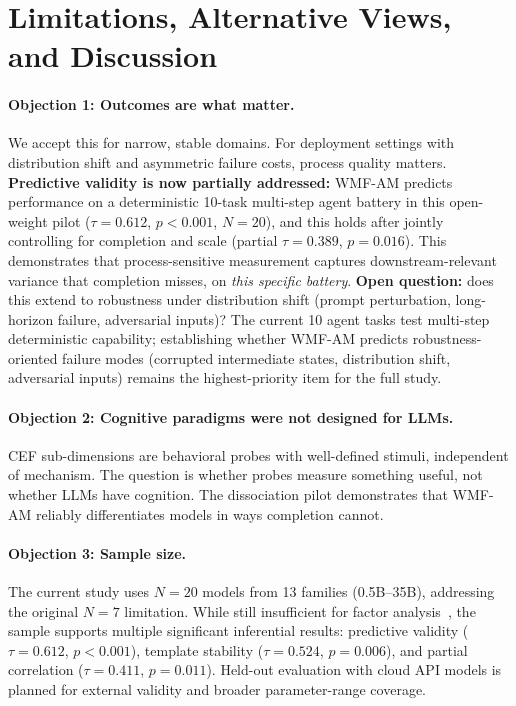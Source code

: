 \documentclass{article}
\begin{document}
\section{Limitations, Alternative Views, and Discussion}
\label{sec:discussion}

\paragraph{Objection 1: Outcomes are what matter.}
We accept this for narrow, stable domains. For deployment settings with
distribution shift and asymmetric failure costs, process quality
matters. \textbf{Predictive validity is now partially addressed:}
WMF-AM predicts performance on a deterministic 10-task multi-step
agent battery in this open-weight pilot ($\tau = 0.612$, $p < 0.001$, $N{=}20$),
and this holds after jointly controlling for completion and scale
(partial $\tau = 0.389$, $p = 0.016$). This demonstrates that
process-sensitive measurement captures downstream-relevant variance
that completion misses, on
\emph{this specific battery}. \textbf{Open question:} does this
extend to robustness under distribution shift (prompt perturbation,
long-horizon failure, adversarial inputs)? The current 10 agent tasks
test multi-step deterministic capability; establishing whether WMF-AM
predicts robustness-oriented failure modes (corrupted intermediate
states, distribution shift, adversarial inputs) remains the
highest-priority item for the full study.

\paragraph{Objection 2: Cognitive paradigms were not designed for LLMs.}
CEF sub-dimensions are behavioral probes with well-defined stimuli,
independent of mechanism. The question is whether probes measure
something useful, not whether LLMs have cognition. The dissociation
pilot demonstrates that WMF-AM reliably differentiates models in ways
completion cannot.

\paragraph{Objection 3: Sample size.}
The current study uses $N{=}20$ models from 13 families (0.5B--35B),
addressing the original $N{=}7$ limitation. While still insufficient for
factor analysis~\citep{card2020little}, the sample
supports multiple significant inferential results: predictive validity
($\tau = 0.612$, $p < 0.001$), template stability ($\tau = 0.524$,
$p = 0.006$), and partial correlation ($\tau = 0.411$, $p = 0.011$).
Held-out evaluation with cloud API models is planned for external
validity and broader parameter-range coverage.
\end{document}
